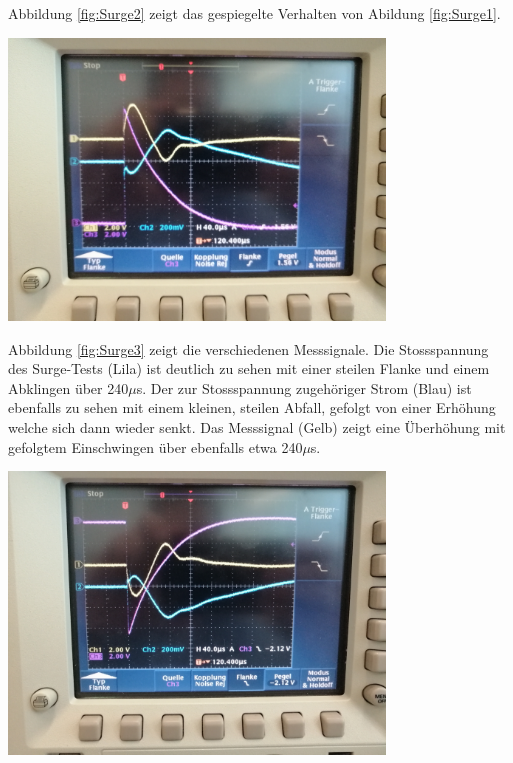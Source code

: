 Abbildung \ref{fig:Surge2} zeigt das gespiegelte Verhalten von Abildung \ref{fig:Surge1}.\\[0.5cm]
\begin{minipage}[b][10cm][t]{1\textwidth}
\centering
\includegraphics[angle=0,width=0.75\textwidth]{graphics/Surge3.jpg}
\label{fig:Surge3}
\end{minipage}
Abbildung \ref{fig:Surge3} zeigt die verschiedenen Messsignale. Die Stossspannung des Surge-Tests (Lila) ist deutlich zu sehen mit einer steilen Flanke und einem Abklingen über 240$\mu$s. Der zur Stossspannung zugehöriger Strom (Blau) ist ebenfalls zu sehen mit einem kleinen, steilen Abfall, gefolgt von einer Erhöhung welche sich dann wieder senkt. Das Messsignal (Gelb) zeigt eine Überhöhung mit gefolgtem Einschwingen über ebenfalls etwa 240$\mu$s.\\[0.5cm]
\begin{minipage}[b][10cm][t]{1\textwidth}
\centering
\includegraphics[angle=0,width=0.75\textwidth]{graphics/Surge4.jpg}
\label{fig:Surge4}
\end{minipage}
